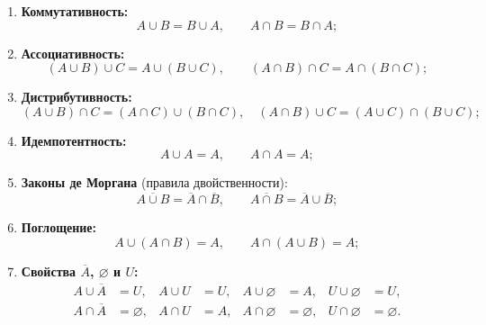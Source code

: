 \documentclass[a4paper,11pt]{article}
\begin{document}
\begin{enumerate}[leftmargin=*]
  \item \textbf{Коммутативность:}
    \[ A \cup B = B \cup A, \qquad A \cap B = B \cap A; \]
  \item \textbf{Ассоциативность:}
    \[ (A \cup B) \cup C = A \cup (B \cup C), \qquad (A \cap B) \cap C = A \cap (B \cap C); \]
  \item \textbf{Дистрибутивность:}
    \[ (A \cup B) \cap C = (A \cap C) \cup (B \cap C), \quad (A \cap B) \cup C = (A \cup C) \cap (B \cup C); \]
  \item \textbf{Идемпотентность:}
    \[ A \cup A = A, \qquad A \cap A = A; \]
  \item \textbf{Законы де Моргана} (правила двойственности):
    \[ \overline{A \cup B} = \overline{A} \cap \overline{B}, \qquad \overline{A \cap B} = \overline{A} \cup \overline{B}; \]
  \item \textbf{Поглощение:}
    \[ A \cup (A \cap B) = A, \qquad A \cap (A \cup B) = A; \]
  \item \textbf{Свойства $\overline{A}$, $\varnothing$ и $U$:}
    \[
      \begin{aligned}
        A \cup \overline{A} &= U, & A \cup U &= U, & A \cup \varnothing &= A, & U \cup \varnothing &= U, \\
        A \cap \overline{A} &= \varnothing, & A \cap U &= A, & A \cap \varnothing &= \varnothing, & U \cap \varnothing &= \varnothing.
      \end{aligned}
    \]
\end{enumerate}
\end{document}
